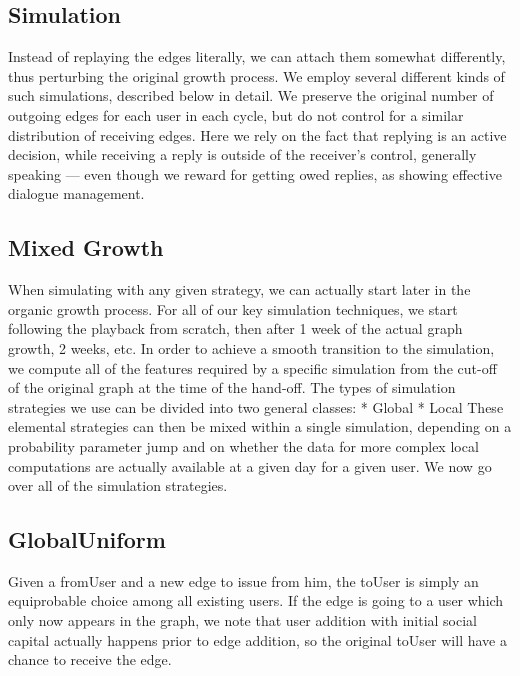 \documentclass[10pt,oneside]{memoir}
\begin{document}
\subsection{Simulation}
\label{simulation}

Instead of replaying the edges literally, we can attach them somewhat differently, thus perturbing the original growth process.  We employ several different kinds of such simulations, described below in detail.  We preserve the original number of outgoing edges for each user in each cycle, but do not control for a similar distribution of receiving edges.  Here we rely on the fact that replying is an active decision, while receiving a reply is outside of the receiver's control, generally speaking --- even though we reward for getting owed replies, as showing effective dialogue management.


\subsection{Mixed Growth}
\label{mixedgrowth}

When simulating with any given strategy, we can actually start later in the organic growth process.  For all of our key simulation techniques, we start following the playback from scratch, then after 1 week of the actual graph growth, 2 weeks, etc.  In order to achieve a smooth transition to the simulation, we compute all of the features required by a specific simulation from the cut-off of the original graph at the time of the hand-off.
The types of simulation strategies we use can be divided into two general classes:
* Global
* Local
These elemental strategies can then be mixed within a single simulation, depending on a probability parameter jump and on whether the data for more complex local computations are actually available at a given day for a given user.  We now go over all of the simulation strategies.


\subsection{GlobalUniform}
\label{globaluniform}

Given a fromUser and a new edge to issue from him, the toUser is simply an equiprobable choice among all existing users.  If the edge is going to a user which only now appears in the graph, we note that user addition with initial social capital actually happens prior to edge addition, so the original toUser will have a chance to receive the edge.
\end{document}
